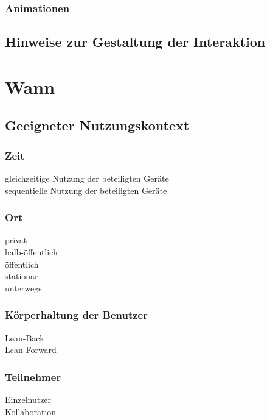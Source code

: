 \subsubsection*{Animationen}
\animations

\subsection*{Hinweise zur Gestaltung der Interaktion}
\designnotes


\section*{Wann}

\subsection*{Geeigneter Nutzungskontext}
\validcontext

\subsubsection*{Zeit}
\checkbox{\simultaneously} gleichzeitige Nutzung der beteiligten Geräte \\
\checkbox{\sequentially} sequentielle Nutzung der beteiligten Geräte

\subsubsection*{Ort}
\checkbox{\private} privat \\
\checkbox{\semipublic} halb-öffentlich \\
\checkbox{\public} öffentlich \\
\checkbox{\stationary} stationär \\
\checkbox{\onthego} unterwegs 

\subsubsection*{Körperhaltung der Benutzer}
\checkbox{\leanback} Lean-Back \\
\checkbox{\leanforward} Lean-Forward 

\subsubsection*{Teilnehmer}
\checkbox{\single} Einzelnutzer \\
\checkbox{\collaboration} Kollaboration

